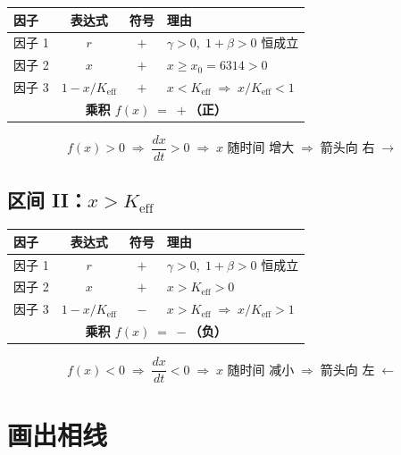 \documentclass[12pt,a4paper]{article}
\begin{document}
\begin{center}
\begin{tabular}{lcc|l}
\toprule
因子 & 表达式 & 符号 & 理由 \\
\midrule
因子 1 & $r$                              & $+$ & $\gamma>0,\;1+\beta>0$ 恒成立 \\
因子 2 & $x$                              & $+$ & $x \geq x_0 = 6314 > 0$ \\
因子 3 & $1 - x/K_{\text{eff}}$           & $+$ & $x < K_{\text{eff}} \;\Rightarrow\; x/K_{\text{eff}} < 1$ \\
\midrule
\multicolumn{4}{c}{\textbf{乘积 $f(x) \;=\; \boxed{+}$（正）}} \\
\bottomrule
\end{tabular}
\end{center}

\[
f(x) > 0 \;\Longrightarrow\; \frac{dx}{dt} > 0 \;\Longrightarrow\; x \text{ 随时间 }\textbf{增大}\;\Longrightarrow\; \text{箭头向 }\textbf{右}\;\longrightarrow
\]

\subsection*{区间 II：$x > K_{\text{eff}}$}

\begin{center}
\begin{tabular}{lcc|l}
\toprule
因子 & 表达式 & 符号 & 理由 \\
\midrule
因子 1 & $r$                              & $+$ & $\gamma>0,\;1+\beta>0$ 恒成立 \\
因子 2 & $x$                              & $+$ & $x > K_{\text{eff}} > 0$ \\
因子 3 & $1 - x/K_{\text{eff}}$           & $-$ & $x > K_{\text{eff}} \;\Rightarrow\; x/K_{\text{eff}} > 1$ \\
\midrule
\multicolumn{4}{c}{\textbf{乘积 $f(x) \;=\; \boxed{-}$（负）}} \\
\bottomrule
\end{tabular}
\end{center}

\[
f(x) < 0 \;\Longrightarrow\; \frac{dx}{dt} < 0 \;\Longrightarrow\; x \text{ 随时间 }\textbf{减小}\;\Longrightarrow\; \text{箭头向 }\textbf{左}\;\longleftarrow
\]

\section{画出相线}
\end{document}
